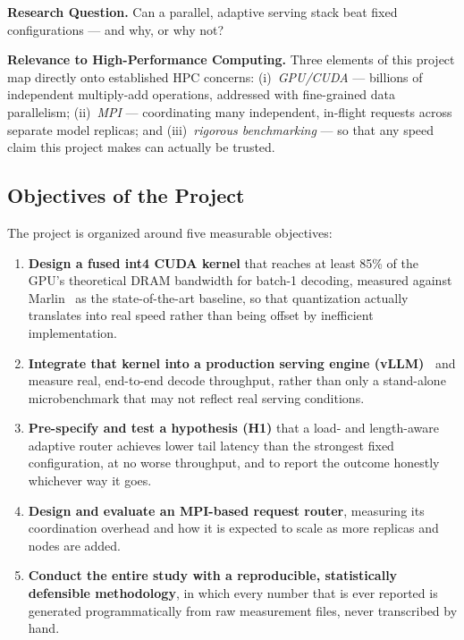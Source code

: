\documentclass[11pt,a4paper]{article}
\begin{document}
\noindent\textbf{Research Question.} Can a parallel, adaptive serving stack beat fixed configurations --- and why, or
why not?

\medskip
\noindent\textbf{Relevance to High-Performance Computing.} Three elements of this project map directly onto
established HPC concerns: (i)~\emph{GPU/CUDA} --- billions of independent multiply-add operations, addressed with
fine-grained data parallelism; (ii)~\emph{MPI} --- coordinating many independent, in-flight requests across separate
model replicas; and (iii)~\emph{rigorous benchmarking} --- so that any speed claim this project makes can actually be
trusted.

\subsection{Objectives of the Project}
The project is organized around five measurable objectives:
\begin{enumerate}[leftmargin=1.6em, itemsep=8pt]
  \item \textbf{Design a fused int4 CUDA kernel} that reaches at least 85\% of the GPU's theoretical DRAM
        bandwidth for batch-1 decoding, measured against Marlin~\cite{marlin} as the state-of-the-art baseline, so
        that quantization actually translates into real speed rather than being offset by inefficient implementation.
  \item \textbf{Integrate that kernel into a production serving engine (vLLM)~\cite{vllm}} and measure real,
        end-to-end decode throughput, rather than only a stand-alone microbenchmark that may not reflect real serving
        conditions.
  \item \textbf{Pre-specify and test a hypothesis (H1)} that a load- and length-aware adaptive router achieves lower
        tail latency than the strongest fixed configuration, at no worse throughput, and to report the outcome
        honestly whichever way it goes.
  \item \textbf{Design and evaluate an MPI-based request router}, measuring its coordination overhead and how it is
        expected to scale as more replicas and nodes are added.
  \item \textbf{Conduct the entire study with a reproducible, statistically defensible methodology}, in which every
        number that is ever reported is generated programmatically from raw measurement files, never transcribed by
        hand.
\end{enumerate}
\end{document}
